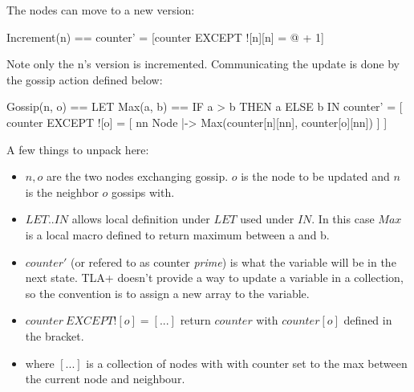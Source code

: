 \documentclass{report}
\begin{document}
The nodes can move to a new version: 
\begin{tla}
    Increment(n) == counter' = [counter EXCEPT ![n][n] = @ + 1]
\end{tla}
\begin{tlatex}
\end{tlatex}
 \newline\newline
Note only the n's version is incremented. Communicating the update is done by
the gossip action defined below:
\begin{tla}
Gossip(n, o) ==                  
    LET Max(a, b) == IF a > b THEN a ELSE b 
    IN counter' = [
        counter EXCEPT ![o] = [
            nn \in Node |->            
                Max(counter[n][nn], counter[o][nn])
            ] 
    ]
\end{tla}
\begin{tlatex}
%
\@x{\@s{16.4} \.{\IN} counter \.{'} \.{=} [}%
\@x{\@s{40.89} counter {\EXCEPT} {\bang} [ o ] \.{=} [}%
%
%
\@x{\@s{57.29} ]}%
\@x{\@s{16.4} ]}%
\end{tlatex}

A few things to unpack here:
\begin{itemize}
    \item $n, o$ are the two nodes exchanging gossip. $o$ is the node to be updated
    and $n$ is the neighbor $o$ gossips with.
    \item $LET .. IN$ allows local definition under $LET$ used under
    $IN$. In this case $Max$ is a local macro defined to return maximum between a and b.
    \item $counter'$ (or refered to as counter \textit{prime}) is what the
    variable will be in the next state. TLA+ doesn't provide a way to update a
    variable in a collection, so the convention is to assign a new array to the variable. 
    \item $counter\ EXCEPT ![o] = [...]$ return $counter$ with $counter[o]$
    defined in the bracket. 
    \item where $[...]$ is a collection of nodes with with counter set to the
    max between the current node and neighbour.
\end{itemize}
\end{document}
